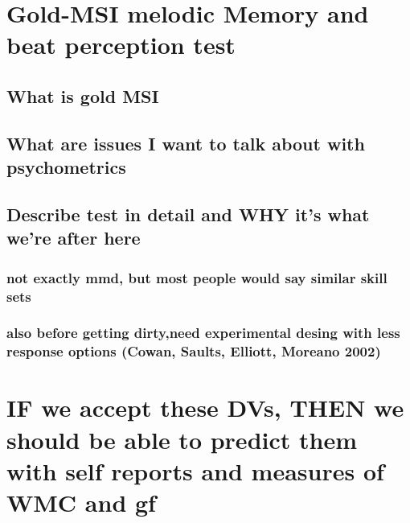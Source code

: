 \documentclass[]{book}
\theoremstyle{definition}
\theoremstyle{definition}
\theoremstyle{definition}
\theoremstyle{remark}
\begin{document}
\hypertarget{gold-msi-melodic-memory-and-beat-perception-test}{%
\section{Gold-MSI melodic Memory and beat perception
test}\label{gold-msi-melodic-memory-and-beat-perception-test}}

\hypertarget{what-is-gold-msi}{%
\subsection{What is gold MSI}\label{what-is-gold-msi}}

\hypertarget{what-are-issues-i-want-to-talk-about-with-psychometrics}{%
\subsection{What are issues I want to talk about with
psychometrics}\label{what-are-issues-i-want-to-talk-about-with-psychometrics}}

\hypertarget{describe-test-in-detail-and-why-its-what-were-after-here}{%
\subsection{Describe test in detail and WHY it's what we're after
here}\label{describe-test-in-detail-and-why-its-what-were-after-here}}

\hypertarget{not-exactly-mmd-but-most-people-would-say-similar-skill-sets}{%
\subsubsection{not exactly mmd, but most people would say similar skill
sets}\label{not-exactly-mmd-but-most-people-would-say-similar-skill-sets}}

\hypertarget{also-before-getting-dirtyneed-experimental-desing-with-less-response-options-cowan-saults-elliott-moreano-2002}{%
\subsubsection{also before getting dirty,need experimental desing with
less response options (Cowan, Saults, Elliott, Moreano
2002)}\label{also-before-getting-dirtyneed-experimental-desing-with-less-response-options-cowan-saults-elliott-moreano-2002}}

\hypertarget{if-we-accept-these-dvs-then-we-should-be-able-to-predict-them-with-self-reports-and-measures-of-wmc-and-gf}{%
\section{IF we accept these DVs, THEN we should be able to predict them
with self reports and measures of WMC and
gf}\label{if-we-accept-these-dvs-then-we-should-be-able-to-predict-them-with-self-reports-and-measures-of-wmc-and-gf}}
\end{document}
